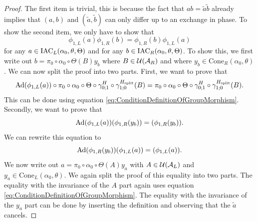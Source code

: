 \documentclass[11pt,a4paper,twoside]{article}
\numberwithin{equation}{section}
\begin{document}
	\begin{proof}
		The first item is trivial, this is because the fact that $ab=\tilde{a}\tilde{b}$ already implies that $(a,b)$ and $(\tilde{a},\tilde{b})$ can only differ up to an exchange in phase. To show the second item, we only have to show that
		\begin{equation}
			\phi_{1,L}(a)\phi_{1,R}(b)=\phi_{1,R}(b)\phi_{1,L}(a)
		\end{equation}
		for any $a\in \textrm{IAC}_{L}(\alpha_0,\theta,\Theta)$ and for any $b\in \textrm{IAC}_{R}(\alpha_0,\theta,\Theta)$. To show this, we first write out $b=\pi_0\circ\alpha_0\circ\Theta(B)y_b$ where $B\in\mathcal U(\mathcal A_R)$ and where $y_b\in\textrm{Cone}_R(\alpha_0,\theta)$. We can now split the proof into two parts. First, we want to prove that
		\begin{equation}
			\Ad{\phi_{1,L}(a)}\circ\pi_0\circ\alpha_0\circ\Theta\circ\gamma_{0;1}^H\circ\gamma^\Hsplit_{1;0}(B)=\pi_0\circ\alpha_0\circ\Theta\circ\gamma_{0;1}^H\circ\gamma^\Hsplit_{1;0}(B).
		\end{equation}
		This can be done using equation \eqref{eq:ConditionDefinitionOfGroupMorphism}. Secondly, we want to prove that
		\begin{equation}
			\Ad{\phi_{1,L}(a)}(\phi_{1,R}(y_b))=(\phi_{1,R}(y_b)).
		\end{equation}
		We can rewrite this equation to
		\begin{equation}
			\Ad{\phi_{1,R}(y_b)}(\phi_{1,L}(a))=(\phi_{1,L}(a)).
		\end{equation}
		We now write out $a=\pi_0\circ\alpha_0\circ\Theta(A)y_a$ with $A\in\mathcal U(\mathcal A_L)$ and $y_a\in\textrm{Cone}_L(\alpha_0,\theta)$. We again split the proof of this equality into two parts. The equality with the invariance of the $A$ part again uses equation \eqref{eq:ConditionDefinitionOfGroupMorphism}. The equality with the invariance of the $y_a$ part can be done by inserting the definition and observing that the $\tilde{a}$ cancels.
	\end{proof}
\end{document}
